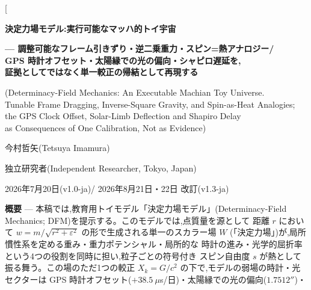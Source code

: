 \documentclass[a4paper,10pt,twocolumn]{ltjsarticle}
\newcommand{\Kt}{X_k}
\begin{document}
\twocolumn[{%
\begin{center}
{\LARGE\bfseries 決定力場モデル:実行可能なマッハ的トイ宇宙\par}
\vspace{4pt}
{\large\bfseries --- 調整可能なフレーム引きずり・逆二乗重力・スピン=熱アナロジー/\\[2pt]
GPS 時計オフセット・太陽縁での光の偏向・シャピロ遅延を,\\[2pt]
証拠としてではなく単一較正の帰結として再現する\par}
\vspace{6pt}
{\small (Determinacy-Field Mechanics: An Executable Machian Toy
Universe.\\ Tunable Frame Dragging, Inverse-Square Gravity, and
Spin-as-Heat Analogies;\\ the GPS Clock Offset, Solar-Limb Deflection and
Shapiro Delay\\ as Consequences of One Calibration, Not as Evidence)\par}
\vspace{8pt}
{\large 今村哲矢(Tetsuya Imamura)\par}
\vspace{2pt}
{\small 独立研究者(Independent Researcher, Tokyo, Japan)\par}
\vspace{4pt}
{\small 2026年7月20日(v1.0-ja)/ 2026年8月21日・22日 改訂(v1.3-ja)\par}
\vspace{6pt}
\end{center}
\begin{center}
\begin{minipage}{0.95\textwidth}
\small
\textbf{概要} ---
本稿では,教育用トイモデル「決定力場モデル」(Determinacy-Field
Mechanics; DFM)を提示する。このモデルでは,点質量を源として
距離 $r$ において $w = m/\sqrt{r^2+\varepsilon^2}$ の形で生成される単一のスカラー場 $W$
(「決定力場」)が,局所慣性系を定める重み・重力ポテンシャル・局所的な
時計の進み・光学的屈折率という4つの役割を同時に担い,粒子ごとの符号付き
スピン自由度 $s$ が熱として振る舞う。この場のただ1つの較正
$\Kt = G/c^2$ の下で,モデルの弱場の時計・光セクターは
GPS 時計オフセット($+38.5\ \mu$s/日)・太陽縁での光の偏向($1.7512''$)・

\end{minipage}
\end{center}}
\end{document}
